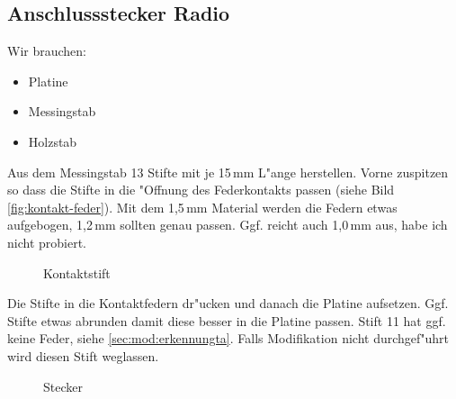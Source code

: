 \documentclass[ngerman,11pt,parskip=half] {scrartcl}
\begin{document}
\subsection{Anschlussstecker Radio} \label{sec:aufbau:anschlussstecker}

Wir brauchen:
\begin{itemize}
\item Platine
\item Messingstab
\item Holzstab
\end{itemize}

Aus dem Messingstab 13 Stifte mit je 15\,mm L"ange herstellen. Vorne zuspitzen so dass die Stifte in die "Offnung des Federkontakts passen (siehe Bild \ref{fig:kontakt-feder}). Mit dem 1,5\,mm Material werden die Federn etwas aufgebogen, 1,2\,mm sollten genau passen. Ggf. reicht auch 1,0\,mm aus, habe ich nicht probiert.

\begin{figure}[H]
\centering
{}
\caption{Kontaktstift} \label{fig:1}
\end{figure}

Die Stifte in die Kontaktfedern dr"ucken und danach die Platine aufsetzen. Ggf. Stifte etwas abrunden damit diese besser in die Platine passen. Stift 11 hat ggf. keine Feder, siehe \ref{sec:mod:erkennungta}. Falls Modifikation nicht durchgef"uhrt wird diesen Stift weglassen.

\begin{figure}[H]
\centering
{}
\caption{Stecker} \label{fig:1}
\end{figure}
\end{document}

